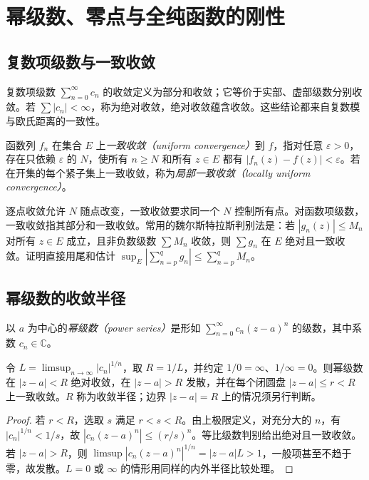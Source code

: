 \setcounter{chapter}{6} %
\chapter{幂级数、零点与全纯函数的刚性}
\label{chap:ca-series}

\section{复数项级数与一致收敛}

复数项级数 $\sum_{n=0}^\infty c_n$ 的收敛定义为部分和收敛；它等价于实部、虚部级数分别收敛。若 $\sum|c_n|<\infty$，称为绝对收敛，绝对收敛蕴含收敛。这些结论都来自复数模与欧氏距离的一致性。

\begin{definition}[一致收敛与局部一致收敛]
函数列 $f_n$ 在集合 $E$ 上\emph{一致收敛（uniform convergence）}到 $f$，指对任意 $\varepsilon>0$，存在只依赖 $\varepsilon$ 的 $N$，使所有 $n\ge N$ 和所有 $z\in E$ 都有 $|f_n(z)-f(z)|<\varepsilon$。若在开集的每个紧子集上一致收敛，称为\emph{局部一致收敛（locally uniform convergence）}。
\end{definition}

逐点收敛允许 $N$ 随点改变，一致收敛要求同一个 $N$ 控制所有点。对函数项级数，一致收敛指其部分和一致收敛。常用的魏尔斯特拉斯判别法是：若 $|g_n(z)|\le M_n$ 对所有 $z\in E$ 成立，且非负数级数 $\sum M_n$ 收敛，则 $\sum g_n$ 在 $E$ 绝对且一致收敛。证明直接用尾和估计 $\sup_E|\sum_{n=p}^qg_n|\le\sum_{n=p}^qM_n$。

\section{幂级数的收敛半径}

\begin{definition}[幂级数]
以 $a$ 为中心的\emph{幂级数（power series）}是形如 $\sum_{n=0}^\infty c_n(z-a)^n$ 的级数，其中系数 $c_n\in\mathbb C$。
\end{definition}

\begin{theorem}[收敛半径公式]
\label{thm:ca-radius}
令 $L=\limsup_{n\to\infty}|c_n|^{1/n}$，取 $R=1/L$，并约定 $1/0=\infty$、$1/\infty=0$。则幂级数在 $|z-a|<R$ 绝对收敛，在 $|z-a|>R$ 发散，并在每个闭圆盘 $|z-a|\le r<R$ 上一致收敛。$R$ 称为收敛半径；边界 $|z-a|=R$ 上的情况须另行判断。
\end{theorem}
\begin{proof}
若 $r<R$，选取 $s$ 满足 $r<s<R$。由上极限定义，对充分大的 $n$，有 $|c_n|^{1/n}<1/s$，故 $|c_n(z-a)^n|\le(r/s)^n$。等比级数判别给出绝对且一致收敛。若 $|z-a|>R$，则 $\limsup|c_n(z-a)^n|^{1/n}=|z-a|L>1$，一般项甚至不趋于零，故发散。$L=0$ 或 $\infty$ 的情形用同样的内外半径比较处理。
\end{proof}

